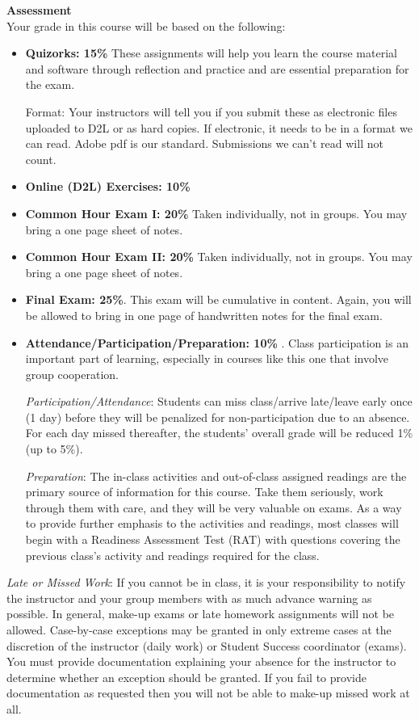 {\bf Assessment}\\
Your grade in this course will be based on the following: 
\begin{itemize}
\item  {\bf Quizorks: 15\%}  These assignments  will help you learn
  the course material and software through 
  reflection and practice and are essential preparation for the exam. 

  Format: Your instructors will tell you if you submit these as
  electronic files uploaded to D2L or as hard copies. If electronic,
  it needs to be in a format we can read.  Adobe pdf is our standard.
  Submissions we can't read will not count.

\item {\bf Online (D2L) Exercises:  10\%}
\item {\bf Common Hour Exam I:  20\%}  Taken individually, not
  in groups. You may bring a one page sheet of notes.
\item {\bf Common Hour Exam II:  20\%} Taken individually, not
  in groups. You may bring a one page sheet of notes.
\item {\bf Final Exam:  25\%}.  This exam will be cumulative in
  content. Again, you will be allowed to bring in one page of
  handwritten notes for the final exam.   
 
\item {\bf Attendance/Participation/Preparation:  10\%} . Class
  participation is an important part of learning, especially in
  courses like this one that involve group cooperation.    

  {\it Participation/Attendance}: Students can miss class/arrive
  late/leave early once (1 day) before they will be penalized for
  non-participation due to an absence.  For each day missed
  thereafter, the students’ overall grade will be reduced 1\% (up to
  5\%).   

  {\it Preparation}: The in-class activities and out-of-class assigned
  readings are the primary source of  information for this course.
  Take them seriously, work through them with care, and they will be
  very valuable on exams.  As a way to provide further emphasis to the
  activities and readings, most classes will begin with a Readiness
  Assessment Test (RAT) with questions covering the previous class's
  activity and readings required for the class.   
\end{itemize}

{\it Late or Missed Work}:  If you cannot be in class, it is your 
responsibility to notify the instructor and your group members with as
much advance warning as possible. In general, make-up exams or late
homework assignments will not be allowed. Case-by-case exceptions may
be granted in only extreme cases at the discretion of the
instructor (daily work) or Student Success coordinator (exams). You
must provide documentation explaining your absence for 
the instructor to determine whether an exception should be granted. If
you fail to provide documentation as requested then you will not be
able to make-up missed work at all.   
 
